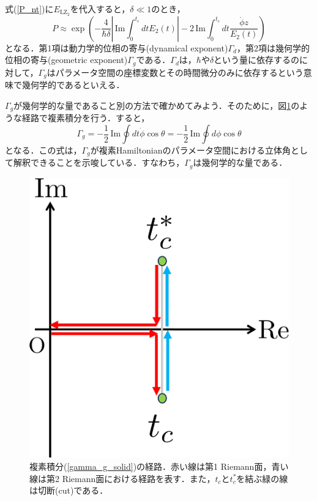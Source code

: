 \documentclass[a4paper, titlepage]{jsreport}
\begin{document}
式(\ref{P_nt})に$E_{\mathrm{LZ}_2}$を代入すると，$\delta \ll 1$のとき，
\begin{equation}
  P \approx \exp\left(-\frac{4}{\hbar \delta} \left|\,\mathrm{Im} \int_0^{t_c} dt E_2(t) \right|-2\,\mathrm{Im} \int_0^{t_c} dt \frac{\Dot{\phi} z}{E_2(t)} \right)
\end{equation}
となる．第1項は動力学的位相の寄与(dynamical exponent)$\Gamma_d$，第2項は幾何学的位相の寄与(geometric exponent)$\Gamma_g$である．$\Gamma_d$は，$\hbar$や$\delta$という量に依存するのに対して，$\Gamma_g$はパラメータ空間の座標変数とその時間微分のみに依存するという意味で幾何学的であるといえる．


$\Gamma_g$が幾何学的な量であること別の方法で確かめてみよう．そのために，図\ref{fig:solidangle_GP}のような経路で複素積分を行う．すると，
\begin{equation}
  \Gamma_g = -\frac{1}{2} \, \mathrm{Im} \oint dt \Dot{\phi} \cos \theta = -\frac{1}{2} \, \mathrm{Im} \oint d\phi \cos \theta \label{gamma_g_solid}
\end{equation}
となる．この式は，$\Gamma_g$が複素Hamiltonianのパラメータ空間における立体角として解釈できることを示唆している．すなわち，$\Gamma_g$は幾何学的な量である．

\begin{figure}[htbp]
  \centering
  \includegraphics[scale=0.5]{figures/solidangle_GP.png}
    \caption{複素積分(\ref{gamma_g_solid})の経路．赤い線は第1 Riemann面，青い線は第2 Riemann面における経路を表す．また，$t_c$と$t_c^*$を結ぶ緑の線は切断(cut)である．}
  \label{fig:solidangle_GP}
\end{figure}
\end{document}
